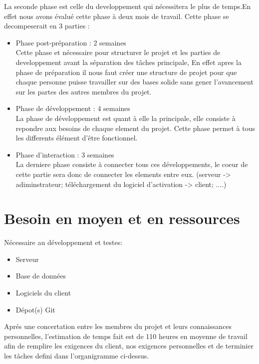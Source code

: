 La seconde phase est celle du developpement qui nécessitera le plus de temps.En effet nous avons évalué cette phase à deux mois de travail.
Cette phase se decompeserait en 3 parties : \newline

\begin{itemize}
	\item Phase post-préparation : 2 semaines\\ 
	Cette phase et nécessaire pour structurer le projet et les parties de developpement avant la séparation des tâches principale, En effet apres la phase de préparation 
	il nous faut créer une structure de projet pour que chaque personne puisse travailler sur des bases solide sans gener l'avancement sur les partes des 
	autres membres du projet. \newline
	\item Phase de développement : 4 semaines\\
	La phase de développement est quant à elle la principale, elle consiste à repondre aux besoins de chaque element du projet. Cette phase permet 
	à tous les differents élément d'être fonctionnel.
	\item Phase d'interaction : 3 semaines\\
	La derniere phase consiste à connecter tous ces développements, le coeur de cette partie sera donc de connecter les elements entre eux. (serveur -> adiminstrateur; téléchargement du logiciel d'activation -> client; ....)
\end{itemize}
\newpage
\section{Besoin en moyen et en ressources}
Nécessaire au développement et testes:
\begin{itemize}
	\item Serveur
	\item Base de données
	\item Logiciels du client
	\item Dépot(s) Git \\ \newline
\end{itemize}
Aprés une concertation entre les membres du projet et leurs connaissances personnelles, l'estimation de temps fait est de
  110 heures en moyenne de travail afin de remplire les exigences du client, nos exigences personnelles et de terminier les tâches defini
	dans l'organigramme ci-dessus.\\ \newline


